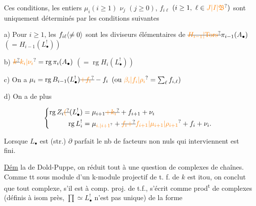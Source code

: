 
Ces conditions, les entiers $\mu_i(i\geq1)$ $\nu_j$ $(j\geq0)$, $f_{i\ell}$ $(i\geq1,\ \ell\in\unsure{J|I|\mathfrak{B}})$ sont uniquement déterminés par les conditions suivantes

a) Pour  $i\geq1$, les $f_{i\ell}\inserted{\ne0}$ sont les  diviseurs élémentaires de $\deleted{\unsure{H_{i-1}|\mathrm{Tors}}}\pi_{i-1}(A_{\bullet})$ $(=H_{i-1}(L_{\bullet}^{!}))$

b) $\deleted{\unsure{k}}\unsure{k_i|\nu_i}=\operatorname{rg}\pi_i(A_{\bullet})$ $(=\operatorname{rg}H_i(L_{\bullet}^{!}))$

c) On a  $\mu_i=\operatorname{rg}B_{i-1}(L_{\bullet}^{!})\deleted{\unsure{+f_i}}-f_i$ $(\text{ou } \unsure{\beta_i|f_i|\rho_i}=\sum_{\ell} f_{i,\ell})$

d) On a de plus

\[
\left\{\begin{aligned}
\operatorname{rg}Z_i\deleted{\unsure{(}}(L_{\bullet}^{!})&=\mu_{i+1}\deleted{\unsure{+k_i}}+f_{i+1}+\nu_i\\
\operatorname{rg}L_i^{!}&=\mu_{\unsure{i\ldotp|i+1}}+\deleted{\unsure{f_i+}}\unsure{f_{i+1}|\mu_{i+1}|\rho_{i+1}}+f_i+\nu_i .
\end{aligned}\right.
\]

Lorsque $L_{\bullet}$ est (str.) $\partial$ parfait  le nb de facteurs non nuls qui interviennent est fini.

\uline{Dém}   la  de Dold-Puppe, on réduit tout à une question de complexes de chaînes. Comme tt sous module d'un k-module projectif de t. f. de $k$ est itou, on conclut que  tout complexe, s'il est   à comp. proj. de t.f., s'écrit comme prod\textsuperscript{t} de complexes (définis à isom    près,   $\prod\simeq L_{\bullet}^{!}$ n'est pas unique) de la forme


